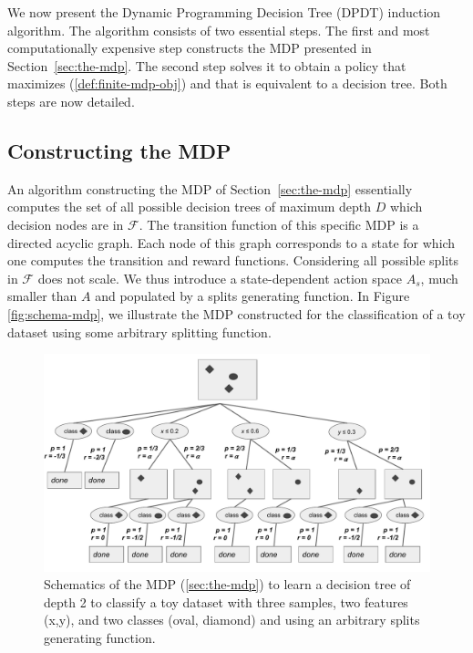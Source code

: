 We now present the Dynamic Programming Decision Tree (DPDT) induction algorithm. 
The algorithm consists of two essential steps. The first and most computationally expensive step constructs the MDP presented in Section~\ref{sec:the-mdp}. 
The second step solves it to obtain a policy that maximizes (\ref{def:finite-mdp-obj}) and that is equivalent to a decision tree. Both steps are now detailed.

\subsection{Constructing the MDP}

An algorithm constructing the MDP of Section~\ref{sec:the-mdp} essentially computes the set of all possible decision trees of maximum depth $D$ which decision nodes are in $\mathcal F$. 
The transition function of this specific MDP is a directed acyclic graph. Each node of this graph corresponds to a state for which one computes the transition and reward functions. 
Considering all possible splits in $\mathcal F$ does not scale.
We thus introduce a state-dependent action space $A_s$, much smaller than $A$ and populated by a splits generating function. In Figure \ref{fig:schema-mdp}, we illustrate the MDP constructed for the classification of a toy dataset using some arbitrary splitting function.

\begin{figure}
      \centering
      \includegraphics[width=0.9\linewidth]{images/figures/schema_mdp.pdf}
      \caption{Schematics of the MDP (\ref{sec:the-mdp}) to learn a decision tree of depth 2 to classify a toy dataset with three samples, two features (x,y), and two classes (oval, diamond) and using an arbitrary splits generating function.}
      \end{figure}

